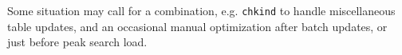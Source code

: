   Some situation may call for a combination, e.g. \verb`chkind` to
handle miscellaneous table updates, and an occasional manual
optimization after batch updates, or just before peak search load.

%
%
%
%
%
%
%
%
%
%
%
%
%
